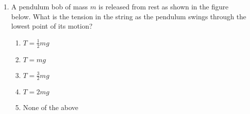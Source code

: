 \documentclass{../../../oss-legalpaper}
\begin{document}
\begin{multicols}{2}
\begin{enumerate}[leftmargin=18pt,resume]
    \columnbreak
    
  \item A pendulum bob of mass $m$ is released from rest as shown in the figure
    below. What is the tension in the string as the pendulum swings through the
    lowest point of its motion?
    \begin{center}
    \end{center}
    \begin{enumerate}[noitemsep,topsep=0pt,leftmargin=18pt,label=(\Alph*)]
    \item $\displaystyle T=\frac{1}{2}mg$
    \item $T=mg$
    \item $\displaystyle T=\frac{3}{2}mg$
    \item $T=2mg$
    \item None of the above
    \end{enumerate}
    

\end{enumerate}
\end{multicols}
\end{document}
